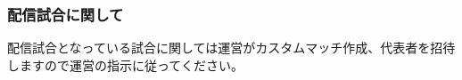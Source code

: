 \documentclass[uplatex,dvipdfmx]{jsarticle}
\begin{document}
	    \subsubsection{配信試合に関して}
	        配信試合となっている試合に関しては運営がカスタムマッチ作成、代表者を招待しますので運営の指示に従ってください。
\end{document}
